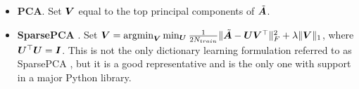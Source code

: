 \begin{itemize}\itemsep-.5mm
    \item \textbf{PCA}. Set $\bm{V}$ equal to the top principal components of $\tilde{\bm{A}}$.
    \item \textbf{SparsePCA} \cite{sparsePCA}. Set $\bm{V} = \operatorname*{argmin}_{\bm{V}} \min_{\bm{U}} \frac{1}{2 N_{train}} \lVert \tilde{\bm{A}} - \bm{U}\bm{V}^\top \rVert^2_F + \lambda \lVert\bm{V}\rVert_1$, where $\bm{U}^\top \bm{U} = \bm{I}$. This is not the only dictionary learning formulation referred to as SparsePCA \cite{spcaSurvey1,spcaSurvey2}, but it is a good representative and is the only one with support in a major Python library.%



\end{itemize}
